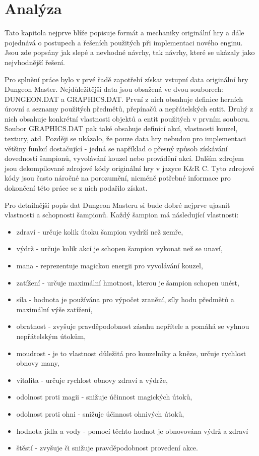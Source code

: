 \chapter{Analýza}

Tato kapitola nejprve blíže popisuje formát a mechaniky originální hry a dále pojednává o postupech a řešeních použitých 
při implementaci nového enginu. Jsou zde popsány jak slepé a nevhodné návrhy, tak návrhy, které se ukázaly 
jako nejvhodnější řešení.

Pro splnění práce bylo v prvé řadě zapotřebí získat vstupní data originální hry Dungeon Master. Nejdůležitější data 
jsou obsažená ve dvou souborech: DUNGEON.DAT a GRAPHICS.DAT. První z nich obsahuje definice herních úrovní a seznamy 
použitých předmětů, přepínačů a nepřátelských entit. Druhý z nich obsahuje konkrétní vlastnosti objektů a entit použitých v prvním souboru. 
Soubor GRAPHICS.DAT pak také obsahuje definicí akcí, vlastnosti kouzel, textury, atd. Později se ukázalo, že pouze data hry nebudou
pro implementaci většiny funkcí dostačující - jedná se například o přesný způsob získávání dovedností šampionů, 
vyvolávání kouzel nebo provádění akcí. Dalším zdrojem jsou dekompilované zdrojové kódy\cite{DMDecompilation} originální hry v jazyce K\&R C.
Tyto zdrojové kódy jsou často náročné na porozumění, nicméně potřebné informace pro dokončení této práce se z nich podařilo získat.

Pro detailnější popis dat Dungeon Masteru si bude dobré nejprve ujasnit vlastnosti a schopnosti šampionů.
Každý šampion má následující vlastnosti:\label{properties-skills}
\begin{itemize}
\item zdraví - určuje kolik útoku šampion vydrží než zemře,
\item výdrž - určuje kolik akcí je schopen šampion vykonat než se unaví, 
\item mana - reprezentuje magickou energii pro vyvolávání kouzel, 
\item zatížení - určuje maximální hmotnost, kterou je šampion schopen unést,
\item síla - hodnota je používána pro výpočet zranění, síly hodu předmětů a maximální výše zatížení,
\item obratnost - zvyšuje pravděpodobnost zásahu nepřítele a pomáhá se vyhnou nepřátelským útokům,
\item moudrost - je to vlastnost důležitá pro kouzelníky a kněze, určuje rychlost obnovy many,
\item vitalita - určuje rychlost obnovy zdraví a výdrže,
\item odolnost proti magii - snižuje účinnost magických útoků,
\item odolnost proti ohni - snižuje účinnost ohnivých útoků,
\item hodnota jídla a vody - pomocí těchto hodnot je obnovována výdrž a zdraví
\item štěstí - zvyšuje či snižuje pravděpodobnost provedení akce.
\end{itemize}

